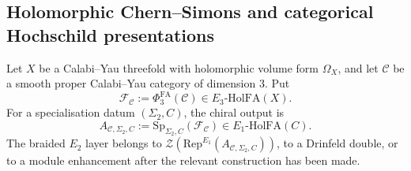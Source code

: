 \providecommand{\hCS}{\mathrm{hCS}}
\providecommand{\HH}{\mathrm{HH}}
\providecommand{\CoHA}{\mathrm{CoHA}}
\providecommand{\PV}{\mathrm{PV}}
\providecommand{\Obs}{\mathrm{Obs}}
\providecommand{\QME}{\mathrm{QME}}
\providecommand{\BV}{\mathrm{BV}}
\providecommand{\Perf}{\mathrm{Perf}}
\providecommand{\FM}{\overline{\mathrm{FM}}}
\providecommand{\At}{\mathrm{At}}
\providecommand{\Td}{\mathrm{Td}}
\providecommand{\ch}{\mathrm{ch}}
\providecommand{\DT}{\mathrm{DT}}
\providecommand{\GW}{\mathrm{GW}}
\providecommand{\PT}{\mathrm{PT}}
\providecommand{\Sp}{\mathrm{Sp}}
\providecommand{\PhiFA}{\Phi^{\mathrm{FA}}}
\providecommand{\Rep}{\mathrm{Rep}}
\providecommand{\Loc}{\mathrm{Loc}}
\providecommand{\gl}{\mathfrak{gl}}
\providecommand{\Gtone}{\mathrm{GRT}_1}
\providecommand{\dbar}{\bar\partial}
\providecommand{\cC}{\mathcal{C}}
\providecommand{\cF}{\mathcal{F}}
\providecommand{\cO}{\mathcal{O}}
\providecommand{\cD}{\mathcal{D}}
\providecommand{\kch}{\kappa_{\mathrm{ch}}}
\providecommand{\kcat}{\kappa_{\mathrm{cat}}}
\providecommand{\kBKM}{\kappa_{\mathrm{BKM}}}
\providecommand{\kfib}{\kappa_{\mathrm{fiber}}}

\subsection{Holomorphic Chern--Simons and categorical Hochschild presentations}
\label{wn:subsec:hcs-vs-cat-synthesis}

Let $X$ be a Calabi--Yau threefold with holomorphic volume form
$\Omega_X$, and let $\cC$ be a smooth proper Calabi--Yau category of
dimension $3$. Put
\[
  \cF_{\cC}:=\PhiFA_3(\cC)\in E_3\text{-}\mathrm{HolFA}(X).
\]
For a specialisation datum $(\Sigma_2,C)$, the chiral output is
\[
  A_{\cC,\Sigma_2,C}
  :=
  \Sp_{\Sigma_2,C}(\cF_{\cC})
  \in E_1\text{-}\mathrm{HolFA}(C).
\]
The braided $E_2$ layer belongs to
$\mathcal Z(\Rep^{E_1}(A_{\cC,\Sigma_2,C}))$, to a Drinfeld double, or
to a module enhancement after the relevant construction has been made.

